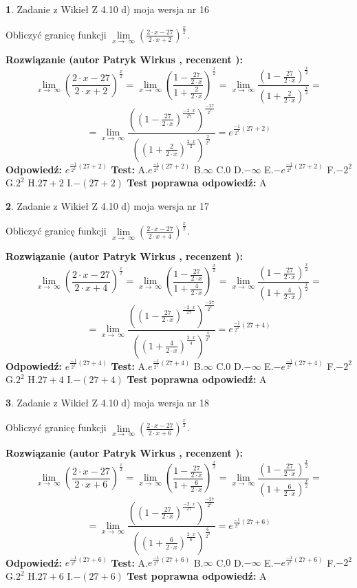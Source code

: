 \documentclass[12pt, a4paper]{article}
\theoremstyle{definition} %
\newtheorem{zad}{}
\newcommand{\zadStart}[1]{\begin{zad}#1\newline}
\newcommand{\zadStop}{\end{zad}}
\newcommand{\rozwStart}[2]{\noindent \textbf{Rozwiązanie (autor #1 , recenzent #2): }\newline}
\newcommand{\rozwStop}{\newline}
\newcommand{\odpStart}{\noindent \textbf{Odpowiedź:}\newline}
\newcommand{\odpStop}{\newline}
\newcommand{\testStart}{\noindent \textbf{Test:}\newline}
\newcommand{\testStop}{\newline}
\newcommand{\kluczStart}{\noindent \textbf{Test poprawna odpowiedź:}\newline}
\newcommand{\kluczStop}{\newline}
\begin{document}
\zadStart{Zadanie z Wikieł Z 4.10 d) moja wersja nr 16}


Obliczyć granicę funkcji  $\lim\limits_{x\to\ \infty}(\frac{2\cdot x-27}{2\cdot x+2})^{\frac{x}{2}}$.
\zadStop
\rozwStart{Patryk Wirkus}{}
$$\lim\limits_{x\to\ \infty}(\frac{2\cdot x-27}{2\cdot x+2})^{\frac{x}{2}} = \lim\limits_{x\to\ \infty}(\frac{1-\frac{27}{2\cdot x}}{1+\frac{2}{2\cdot x}})^{\frac{x}{2}}=\lim\limits_{x\to\ \infty}\frac{(1-\frac{27}{2\cdot x})^{\frac{x}{2}}}{(1+\frac{2}{2\cdot x})^{\frac{x}{2}}}=$$
$$=\lim\limits_{x\to\ \infty}\frac{((1-\frac{27}{2\cdot x})^{\frac{-2\cdot x}{27}})^{\frac{-27}{2^{2}}}}{((1+\frac{2}{2\cdot x})^{\frac{2\cdot x}{2}})^{\frac{2}{2^{2}}}}=e^{\frac{-1}{2^{2}}(27+2)}$$
\rozwStop
\odpStart
$e^{\frac{-1}{2^{2}}(27+2)}$
\odpStop
\testStart
A.$e^{\frac{-1}{2^{2}}(27+2)}$ B.$\infty$ C.$0$ D.$-\infty$ E.$-e^{\frac{-1}{2^{2}}(27+2)}$
F.$-2^{2}$ G.$2^{2}$
H.$27+2$
I.$-(27+2)$
\testStop
\kluczStart
A
\kluczStop



\zadStart{Zadanie z Wikieł Z 4.10 d) moja wersja nr 17}


Obliczyć granicę funkcji  $\lim\limits_{x\to\ \infty}(\frac{2\cdot x-27}{2\cdot x+4})^{\frac{x}{2}}$.
\zadStop
\rozwStart{Patryk Wirkus}{}
$$\lim\limits_{x\to\ \infty}(\frac{2\cdot x-27}{2\cdot x+4})^{\frac{x}{2}} = \lim\limits_{x\to\ \infty}(\frac{1-\frac{27}{2\cdot x}}{1+\frac{4}{2\cdot x}})^{\frac{x}{2}}=\lim\limits_{x\to\ \infty}\frac{(1-\frac{27}{2\cdot x})^{\frac{x}{2}}}{(1+\frac{4}{2\cdot x})^{\frac{x}{2}}}=$$
$$=\lim\limits_{x\to\ \infty}\frac{((1-\frac{27}{2\cdot x})^{\frac{-2\cdot x}{27}})^{\frac{-27}{2^{2}}}}{((1+\frac{4}{2\cdot x})^{\frac{2\cdot x}{4}})^{\frac{4}{2^{2}}}}=e^{\frac{-1}{2^{2}}(27+4)}$$
\rozwStop
\odpStart
$e^{\frac{-1}{2^{2}}(27+4)}$
\odpStop
\testStart
A.$e^{\frac{-1}{2^{2}}(27+4)}$ B.$\infty$ C.$0$ D.$-\infty$ E.$-e^{\frac{-1}{2^{2}}(27+4)}$
F.$-2^{2}$ G.$2^{2}$
H.$27+4$
I.$-(27+4)$
\testStop
\kluczStart
A
\kluczStop



\zadStart{Zadanie z Wikieł Z 4.10 d) moja wersja nr 18}


Obliczyć granicę funkcji  $\lim\limits_{x\to\ \infty}(\frac{2\cdot x-27}{2\cdot x+6})^{\frac{x}{2}}$.
\zadStop
\rozwStart{Patryk Wirkus}{}
$$\lim\limits_{x\to\ \infty}(\frac{2\cdot x-27}{2\cdot x+6})^{\frac{x}{2}} = \lim\limits_{x\to\ \infty}(\frac{1-\frac{27}{2\cdot x}}{1+\frac{6}{2\cdot x}})^{\frac{x}{2}}=\lim\limits_{x\to\ \infty}\frac{(1-\frac{27}{2\cdot x})^{\frac{x}{2}}}{(1+\frac{6}{2\cdot x})^{\frac{x}{2}}}=$$
$$=\lim\limits_{x\to\ \infty}\frac{((1-\frac{27}{2\cdot x})^{\frac{-2\cdot x}{27}})^{\frac{-27}{2^{2}}}}{((1+\frac{6}{2\cdot x})^{\frac{2\cdot x}{6}})^{\frac{6}{2^{2}}}}=e^{\frac{-1}{2^{2}}(27+6)}$$
\rozwStop
\odpStart
$e^{\frac{-1}{2^{2}}(27+6)}$
\odpStop
\testStart
A.$e^{\frac{-1}{2^{2}}(27+6)}$ B.$\infty$ C.$0$ D.$-\infty$ E.$-e^{\frac{-1}{2^{2}}(27+6)}$
F.$-2^{2}$ G.$2^{2}$
H.$27+6$
I.$-(27+6)$
\testStop
\kluczStart
A
\kluczStop
\end{document}
